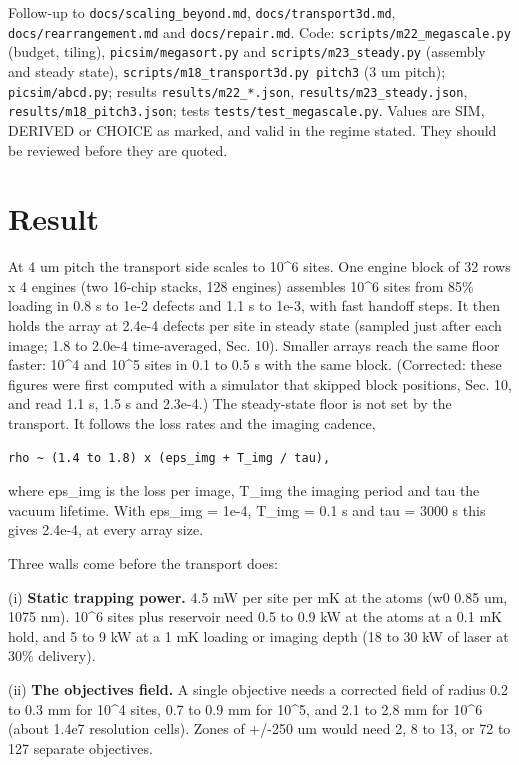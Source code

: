 Follow-up to \texttt{docs/scaling\_beyond.md},
\texttt{docs/transport3d.md}, \texttt{docs/rearrangement.md} and
\texttt{docs/repair.md}. Code: \texttt{scripts/m22\_megascale.py}
(budget, tiling), \texttt{picsim/megasort.py} and
\texttt{scripts/m23\_steady.py} (assembly and steady state),
\texttt{scripts/m18\_transport3d.py\ pitch3} (3 um pitch);
\texttt{picsim/abcd.py}; results \texttt{results/m22\_*.json},
\texttt{results/m23\_steady.json}, \texttt{results/m18\_pitch3.json};
tests \texttt{tests/test\_megascale.py}. Values are SIM, DERIVED or
CHOICE as marked, and valid in the regime stated. They should be
reviewed before they are quoted.

\hypertarget{1-result}{%
\section{Result}\label{megascale-1-result}}

At 4 um pitch the transport side scales to 10\^{}6 sites. One engine
block of 32 rows x 4 engines (two 16-chip stacks, 128 engines) assembles
10\^{}6 sites from 85\% loading in 0.8 s to 1e-2 defects and 1.1 s to
1e-3, with fast handoff steps. It then holds the array at 2.4e-4 defects
per site in steady state (sampled just after each image; 1.8 to 2.0e-4
time-averaged, Sec. 10). Smaller arrays reach the same floor faster:
10\^{}4 and 10\^{}5 sites in 0.1 to 0.5 s with the same block.
(Corrected: these figures were first computed with a simulator that
skipped block positions, Sec. 10, and read 1.1 s, 1.5 s and 2.3e-4.) The
steady-state floor is not set by the transport. It follows the loss
rates and the imaging cadence,

\begin{verbatim}
rho ~ (1.4 to 1.8) x (eps_img + T_img / tau),
\end{verbatim}

where eps\_img is the loss per image, T\_img the imaging period and tau
the vacuum lifetime. With eps\_img = 1e-4, T\_img = 0.1 s and tau = 3000
s this gives 2.4e-4, at every array size.

Three walls come before the transport does:

(i) \textbf{Static trapping power.} 4.5 mW per site per mK at the atoms
(w0 0.85 um, 1075 nm). 10\^{}6 sites plus reservoir need 0.5 to 0.9 kW
at the atoms at a 0.1 mK hold, and 5 to 9 kW at a 1 mK loading or
imaging depth (18 to 30 kW of laser at 30\% delivery).

(ii) \textbf{The objective\textquotesingle s field.} A single objective
needs a corrected field of radius 0.2 to 0.3 mm for 10\^{}4 sites, 0.7
to 0.9 mm for 10\^{}5, and 2.1 to 2.8 mm for 10\^{}6 (about 1.4e7
resolution cells). Zones of +/-250 um would need 2, 8 to 13, or 72 to
127 separate objectives.


